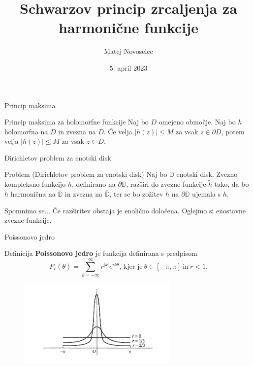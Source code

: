 \documentclass{beamer}
\title{Schwarzov princip zrcaljenja za harmonične funkcije}
\author{Matej Novoselec}
\institute[UL FMF]{FMF Fakulteta za matematiko in fiziko}
\date{5. april 2023}
\theoremstyle{definition}
\theoremstyle{definition}
\begin{document}
\begin{frame}
   \titlepage
\end{frame}
\begin{frame}{Princip maksima}
   \begin{alertblock}{Princip maksima za holomorfne funkcije}
      Naj bo $D$ omejeno območje. Naj bo $h$ holomorfna na $D$ in zvezna na $\overline{D}$.
      Če velja $|h(z)| \leq M$ za vsak $z \in \partial D$, potem velja $|h(z)| \leq M$ za vsak $z \in \overline{D}$.
   \end{alertblock}  
\end{frame}
\begin{frame}{Dirichletov problem za enotski disk}
   \begin{alertblock}{Problem (Dirichletov problem za enotski disk)}
        Naj bo $\mathbb{D}$ enotski disk. Zvezno kompleksno funkcijo $h$, definirano na $\partial \mathbb{D}$, razširi do zvezne funkcije $\widetilde{h}$ tako, da bo $\widetilde{h}$ harmonična na $\mathbb{D}$ in zvezna na $\overline{\mathbb{D}}$, ter se bo zožitev $\widetilde{h}$ na $\partial \mathbb{D}$ ujemala s $h$.
   \end{alertblock}
   \pause
   \begin{exampleblock}{Spomnimo se...}
    Če razširitev obstaja je enolično določena.
    \pause
    \newline
    Oglejmo si enostavne zvezne funkcije.
   \end{exampleblock}
\end{frame}

\begin{frame}{Poissonovo jedro}
   \begin{block}{Definicija}
      \textbf{Poissonovo jedro} je funkcija definirana s predpisom
      $$
         P_r(\theta) = \sum_{k = -\infty}^{\infty}{r^{|k|} e^{i k \theta}}\text{, kjer je}~\theta \in [-\pi, \pi]~\text{in}~ r < 1.
      $$
   \end{block}
   \pause
   \begin{figure}
      \begin{center}
         \includegraphics[width=0.70\textwidth]{poissonkernel.png}
      \end{center}
   \end{figure}
\end{frame}
\end{document}
